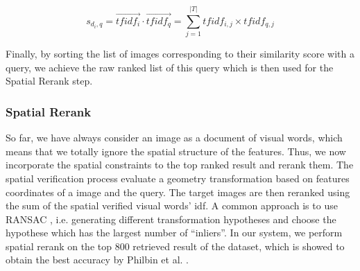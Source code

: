 \begin{equation}
s_{d_{i}, q} = \vec{{tfidf}_{i}} \cdot \vec{{tfidf}_{q}} = \sum\limits_{j = 1}^{\left|T\right|} {tfidf}_{i, j} \times {tfidf}_{q, j}
\end{equation} 

Finally, by sorting the list of images corresponding to their similarity score with a query, we achieve the raw ranked list of this query which is then used for the Spatial Rerank step.

\subsubsection{Spatial Rerank} \label{section:spatial_rerank}

So far, we have always consider an image as a document of visual words, which means that we totally ignore the spatial structure of the features. Thus, we now incorporate the spatial constraints to the top ranked result and rerank them. The spatial verification process evaluate a geometry transformation based on features coordinates of a image and the query. The target images are then reranked using the sum of the spatial verified visual words' idf. A common approach is to use RANSAC \cite{Fischler1981}, i.e. generating different transformation hypotheses and choose the hypothese which has the largest number of ``inliers''. In our system, we perform spatial rerank on the top 800 retrieved result of the dataset, which is showed to obtain the best accuracy by Philbin et al. \cite{2}.
